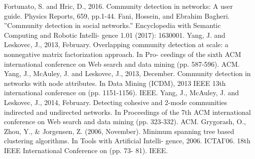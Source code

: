 \documentclass[conference]{IEEEtran}
\begin{document}
\begin{thebibliography}{}
 Fortunato, S. and Hric, D., 2016. Community detection in networks: A
user guide. Physics Reports, 659, pp.1-44.
 Fani, Hossein, and Ebrahim Bagheri. ”Community detection in social
networks.” Encyclopedia with Semantic Computing and Robotic Intelli-
gence 1.01 (2017): 1630001.
 Yang, J. and Leskovec, J., 2013, February. Overlapping community
detection at scale: a nonnegative matrix factorization approach. In Pro-
ceedings of the sixth ACM international conference on Web search and
data mining (pp. 587-596). ACM.
 Yang, J., McAuley, J. and Leskovec, J., 2013, December. Community
detection in networks with node attributes. In Data Mining (ICDM), 2013
IEEE 13th international conference on (pp. 1151-1156). IEEE.
 Yang, J., McAuley, J. and Leskovec, J., 2014, February. Detecting
cohesive and 2-mode communities indirected and undirected networks. In
Proceedings of the 7th ACM international conference on Web search and
data mining (pp. 323-332). ACM.
 Grygorash, O., Zhou, Y., \& Jorgensen, Z. (2006, November). Minimum
spanning tree based clustering algorithms. In Tools with Artiﬁcial Intelli-
gence, 2006. ICTAI’06. 18th IEEE International Conference on (pp. 73-
81). IEEE.



\end{thebibliography}




\end{document}
